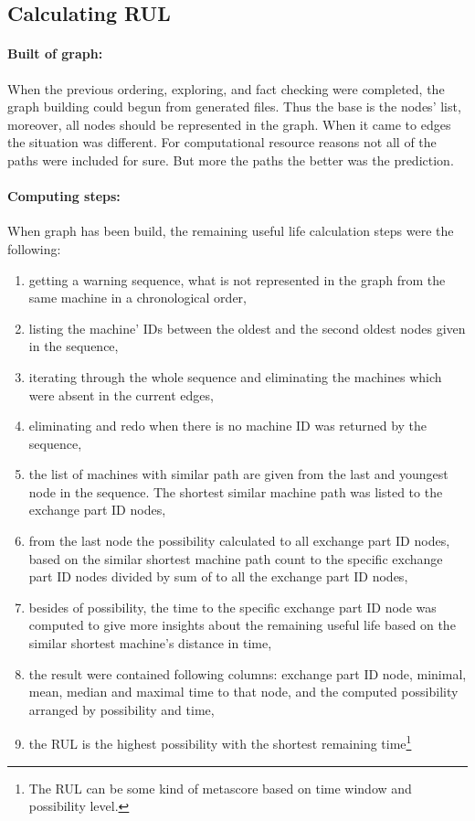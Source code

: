 	\subsection{Calculating RUL}
			\paragraph{Built of graph:}
			When the previous ordering, exploring, and fact checking were completed, the graph building could begun from generated files. Thus the base is the nodes' list, moreover, all nodes should be represented in the graph. When it came to edges the situation was different. For computational resource reasons not all of the paths were included for sure. But more the paths the better was the prediction.
			\paragraph{Computing steps:}
			When graph has been build, the remaining useful life calculation steps were the following:
			\begin{enumerate}
				\item{getting a warning sequence, what is not represented in the graph from the same machine in a chronological order,}
				\item{listing the machine' IDs between the oldest and the second oldest nodes given in the sequence,}
				\item{iterating through the whole sequence and eliminating the machines which were absent in the current edges,}
				\item{eliminating and redo when there is no machine ID was returned by the sequence,}
				\item{the list of machines with similar path are given from the last and youngest node in the sequence. The shortest similar machine path was listed to the exchange part ID nodes,}
				\item{from the last node the possibility calculated to all exchange part ID nodes, based on the similar shortest machine path count to the specific exchange part ID nodes divided by sum of to all the exchange part ID nodes,}
				\item{besides of possibility, the time to the specific exchange part ID node was computed to give more insights about the remaining useful life based on the similar shortest machine's distance in time,}
				\item{the result were contained following columns: exchange part ID node, minimal, mean, median and maximal time to that node, and the computed possibility arranged by possibility and time,} 
		 		\item{the RUL is the highest possibility with the shortest remaining time\footnote{The RUL can be some kind of metascore based on time window and possibility level.}}
		 	\end{enumerate}
